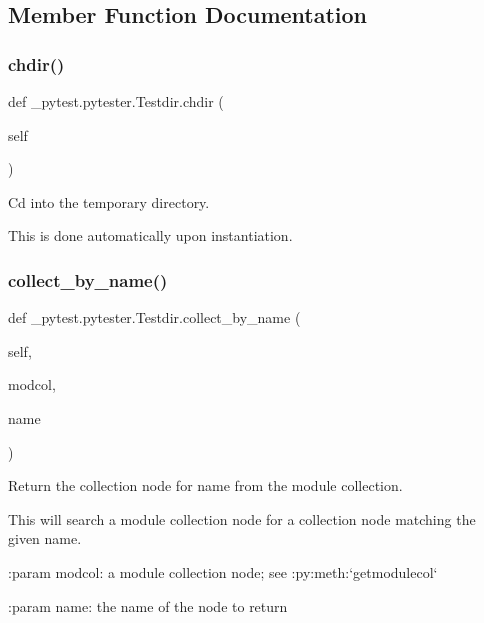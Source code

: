 \subsection{Member Function Documentation}
\mbox{\label{class__pytest_1_1pytester_1_1_testdir_ad5ebca0ac988f93cd0009dd1aaf8efc7}} 
\subsubsection{\texorpdfstring{chdir()}{chdir()}}
{\footnotesize\ttfamily def \+\_\+pytest.\+pytester.\+Testdir.\+chdir (\begin{DoxyParamCaption}\item[{}]{self }\end{DoxyParamCaption})}

\begin{DoxyVerb}Cd into the temporary directory.

This is done automatically upon instantiation.\end{DoxyVerb}
 \mbox{\label{class__pytest_1_1pytester_1_1_testdir_a9679d38d4e3fb6ce44f5ddc45547a784}} 
\subsubsection{\texorpdfstring{collect\+\_\+by\+\_\+name()}{collect\_by\_name()}}
{\footnotesize\ttfamily def \+\_\+pytest.\+pytester.\+Testdir.\+collect\+\_\+by\+\_\+name (\begin{DoxyParamCaption}\item[{}]{self,  }\item[{}]{modcol,  }\item[{}]{name }\end{DoxyParamCaption})}

\begin{DoxyVerb}Return the collection node for name from the module collection.

This will search a module collection node for a collection node
matching the given name.

:param modcol: a module collection node; see :py:meth:`getmodulecol`

:param name: the name of the node to return\end{DoxyVerb}
 \mbox{\label{class__pytest_1_1pytester_1_1_testdir_a3635442c6e4b98ee70510179bb4a636f}} 

